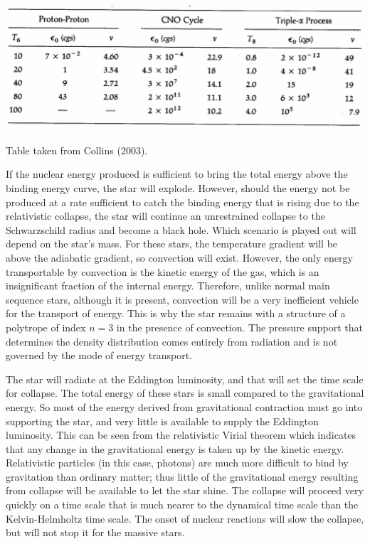 \documentclass[a4paper,10pt]{article}
\begin{document}
\begin{table}[h]
    \centering
    \includegraphics[width=14cm]{figures/TempDependence.png}
    \caption{\footnotesize{Table taken from Collins (2003).}}
    \label{table:tempdependence}
\end{table}

{\noindent}If the nuclear energy produced is sufficient to bring the total energy above the binding energy curve, the star will explode. However, should the energy not be produced at a rate sufficient to catch the binding energy that is rising due to the relativistic collapse, the star will continue an unrestrained collapse to the Schwarzschild radius and become a black hole. Which scenario is played out will depend on the star's mass. For these stars, the temperature gradient will be above the adiabatic gradient, so convection will exist. However, the only energy transportable by convection is the kinetic energy of the gas, which is an insignificant fraction of the internal energy. Therefore, unlike normal main sequence stars, although it is present, convection will be a very inefficient vehicle for the transport of energy. This is why the star remains with a structure of a polytrope of index $n=3$ in the presence of convection. The pressure support that determines the density distribution comes entirely from radiation and is not governed by the mode of energy transport.

{\noindent}The star will radiate at the Eddington luminosity, and that will set the time scale for collapse. The total energy of these stars is small compared to the gravitational energy. So most of the energy derived from gravitational contraction must go into supporting the star, and very little is available to supply the Eddington luminosity. This can be seen from the relativistic Virial theorem which indicates that any change in the gravitational energy is taken up by the kinetic energy. Relativistic particles (in this case, photons) are much more difficult to bind by gravitation than ordinary matter; thus little of the gravitational energy resulting from collapse will be available to let the star shine. The collapse will proceed very quickly on a time scale that is much nearer to the dynamical time scale than the Kelvin-Helmholtz time scale. The onset of nuclear reactions will slow the collapse, but will not stop it for the massive stars.
\end{document}
